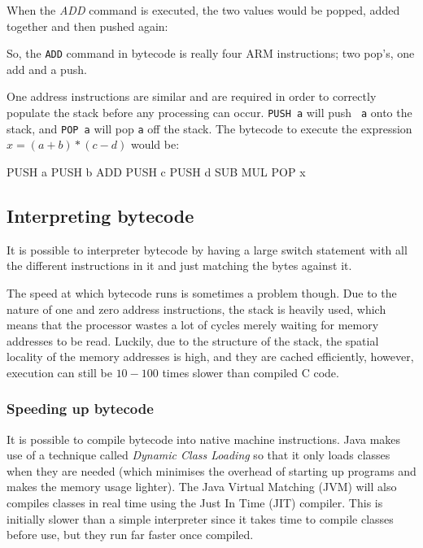When the {\it ADD} command is executed, the two values would be popped, added
together and then pushed again:

\begin{center}
\begin{drawstack}
		
\end{drawstack}
\end{center}

So, the {\tt ADD} command in bytecode is really four ARM instructions; two
pop's, one add and a push.

One address instructions are similar and are required in order to correctly
populate the stack before any processing can occur. {\tt PUSH a} will push {\tt
a} onto the stack, and {\tt POP a} will pop {\tt a} off the stack. The bytecode
to execute the expression $x = (a+b) * (c-d)$ would be:

\begin{listing}{1}
	PUSH a
	PUSH b
	ADD
	PUSH c
	PUSH d
	SUB
	MUL
	POP x
\end{listing}

\subsection{Interpreting bytecode}

It is possible to interpreter bytecode by having a large switch statement with
all the different instructions in it and just matching the bytes against it.

The speed at which bytecode runs is sometimes a problem though. Due to the
nature of one and zero address instructions, the stack is heavily used, which
means that the processor wastes a lot of cycles merely waiting for memory
addresses to be read. Luckily, due to the structure of the stack, the spatial
locality of the memory addresses is high, and they are cached efficiently,
however, execution can still be $10-100$ times slower than compiled C code.

\subsubsection{Speeding up bytecode}

It is possible to compile bytecode into native machine instructions. Java makes
use of a technique called {\it Dynamic Class Loading} so that it only loads
classes when they are needed (which minimises the overhead of starting up
programs and makes the memory usage lighter). The Java Virtual Matching (JVM)
will also compiles classes in real time using the Just In Time (JIT) compiler.
This is initially slower than a simple interpreter since it takes time to
compile classes before use, but they run far faster once compiled.

